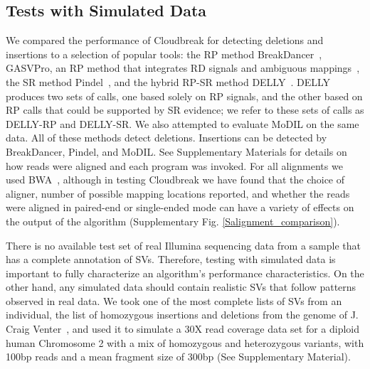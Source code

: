 \documentclass{bioinfo}
\begin{document}
\subsection{Tests with Simulated Data}

We compared the performance of Cloudbreak for detecting deletions and insertions to a selection of popular tools: the RP method BreakDancer~\citep{Chen:2009p3}, GASVPro, an RP method that integrates RD signals and ambiguous mappings~\citep{Sindi:2012kk}, the SR method Pindel~\citep{Ye:2009p2}, and the hybrid RP-SR method DELLY~\citep{Rausch:2012he}. DELLY produces two sets of calls, one based solely on RP signals, and the other based on RP calls that could be supported by SR evidence; we refer to these sets of calls as DELLY-RP and DELLY-SR. We also attempted to evaluate MoDIL on the same data. All of these methods detect deletions. Insertions can be detected by BreakDancer, Pindel, and MoDIL. See Supplementary Materials for details on how reads were aligned and each program was invoked. For all alignments we used BWA~\citep{Li:2009p836}, although in testing Cloudbreak we have found that the choice of aligner, number of possible mapping locations reported, and whether the reads were aligned in paired-end or single-ended mode can have a variety of effects on the output of the algorithm (Supplementary Fig. \ref{Salignment_comparison}).

There is no available test set of real Illumina sequencing data from a sample that has a complete annotation of SVs. Therefore, testing with simulated data is important to fully characterize an algorithm's performance characteristics. On the other hand, any simulated data should contain realistic SVs that follow patterns observed in real data. We took one of the most complete lists of SVs from an individual, the list of homozygous insertions and deletions from the genome of J. Craig Venter~\citep{Levy:2007fb}, and used it to simulate a 30X read coverage data set for a diploid human Chromosome 2 with a mix of homozygous and heterozygous variants, with 100bp reads and a mean fragment size of 300bp (See Supplementary Material).
\end{document}
